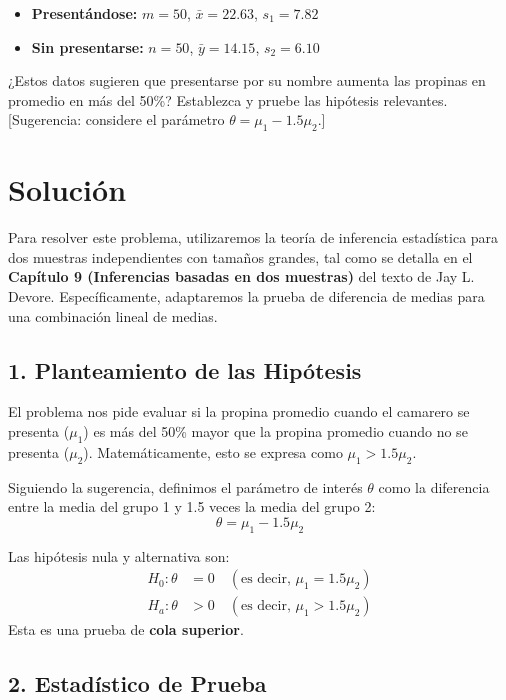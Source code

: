 \documentclass[12pt]{article}
\begin{document}
\begin{itemize}
    \item \textbf{Presentándose:} $m = 50$, $\bar{x} = 22.63$, $s_1 = 7.82$
    \item \textbf{Sin presentarse:} $n = 50$, $\bar{y} = 14.15$, $s_2 = 6.10$
\end{itemize}

¿Estos datos sugieren que presentarse por su nombre aumenta las propinas en promedio en más del 50\%? Establezca y pruebe las hipótesis relevantes. [Sugerencia: considere el parámetro $\theta = \mu_1 - 1.5\mu_2$.]

\section*{Solución}

Para resolver este problema, utilizaremos la teoría de inferencia estadística para dos muestras independientes con tamaños grandes, tal como se detalla en el \textbf{Capítulo 9 (Inferencias basadas en dos muestras)} del texto de Jay L. Devore. Específicamente, adaptaremos la prueba de diferencia de medias para una combinación lineal de medias.

\subsection*{1. Planteamiento de las Hipótesis}

El problema nos pide evaluar si la propina promedio cuando el camarero se presenta ($\mu_1$) es más del 50\% mayor que la propina promedio cuando no se presenta ($\mu_2$). Matemáticamente, esto se expresa como $\mu_1 > 1.5\mu_2$.

Siguiendo la sugerencia, definimos el parámetro de interés $\theta$ como la diferencia entre la media del grupo 1 y 1.5 veces la media del grupo 2:
$$ \theta = \mu_1 - 1.5\mu_2 $$

Las hipótesis nula y alternativa son:
\begin{align*}
    H_0: \theta &= 0 \quad (\text{es decir, } \mu_1 = 1.5\mu_2) \\
    H_a: \theta &> 0 \quad (\text{es decir, } \mu_1 > 1.5\mu_2)
\end{align*}
Esta es una prueba de \textbf{cola superior}.

\subsection*{2. Estadístico de Prueba}
\end{document}
